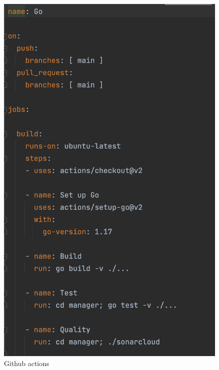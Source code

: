     \begin{figure}[H]
        \centering
        \includegraphics[scale = 0.7]{part/Proyecto_ejecutivo/memoria_constructiva/cicd}
        \caption{Github actions}\label{fig:cicd}
    \end{figure}